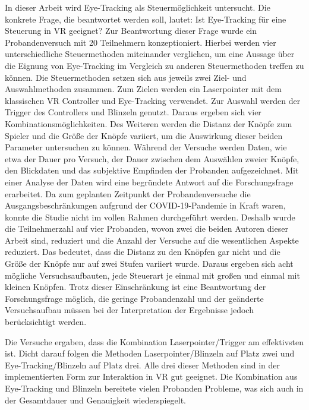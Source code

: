 In dieser Arbeit wird Eye-Tracking als Steuermöglichkeit untersucht. Die konkrete Frage, die beantwortet werden soll, lautet: \glqq Ist Eye-Tracking für eine Steuerung in \ac{VR} geeignet?\grqq{} Zur Beantwortung dieser Frage wurde ein Probandenversuch mit 20 Teilnehmern konzeptioniert. Hierbei werden vier unterschiedliche Steuermethoden miteinander verglichen, um eine Aussage über die Eignung von Eye-Tracking im Vergleich zu anderen Steuermethoden treffen zu können. Die Steuermethoden setzen sich aus jeweils zwei Ziel- und Auswahlmethoden zusammen. Zum Zielen werden ein Laserpointer mit dem klassischen \ac{VR} Controller und Eye-Tracking verwendet. Zur Auswahl werden der Trigger des Controllers und Blinzeln genutzt. Daraus ergeben sich vier Kombinationsmöglichkeiten. Des Weiteren werden die Distanz der Knöpfe zum Spieler und die Größe der Knöpfe variiert, um die Auswirkung dieser beiden Parameter untersuchen zu können. Während der Versuche werden Daten, wie etwa der Dauer pro Versuch, der Dauer zwischen dem Auswählen zweier Knöpfe, den Blickdaten und das subjektive Empfinden der Probanden aufgezeichnet. Mit einer Analyse der Daten wird eine begründete Antwort auf die Forschungsfrage erarbeitet. Da zum geplanten Zeitpunkt der Probandenversuche die Ausgangsbeschränkungen aufgrund der \ac{COVID-19}-Pandemie in Kraft waren, konnte die Studie nicht im vollen Rahmen durchgeführt werden. Deshalb wurde die Teilnehmerzahl auf vier Probanden, wovon zwei die beiden Autoren dieser Arbeit sind, reduziert und die Anzahl der Versuche auf die wesentlichen Aspekte reduziert. Das bedeutet, dass die Distanz zu den Knöpfen gar nicht und die Größe der Knöpfe nur auf zwei Stufen variiert wurde. Daraus ergeben sich acht mögliche Versuchsaufbauten, jede Steuerart je einmal mit großen und einmal mit kleinen Knöpfen. Trotz dieser Einschränkung ist eine Beantwortung der Forschungsfrage möglich, die geringe Probandenzahl und der geänderte Versuchsaufbau müssen bei der Interpretation der Ergebnisse jedoch berücksichtigt werden. 

Die Versuche ergaben, dass die Kombination Laserpointer/Trigger am effektivsten ist. Dicht darauf folgen die Methoden Laserpointer/Blinzeln auf Platz zwei und Eye-Tracking/Blinzeln auf Platz drei. Alle drei dieser Methoden sind in der implementierten Form zur Interaktion in \ac{VR} gut geeignet. Die Kombination aus Eye-Tracking und Blinzeln bereitete vielen Probanden Probleme, was sich auch in der Gesamtdauer und Genauigkeit wiederspiegelt. 
